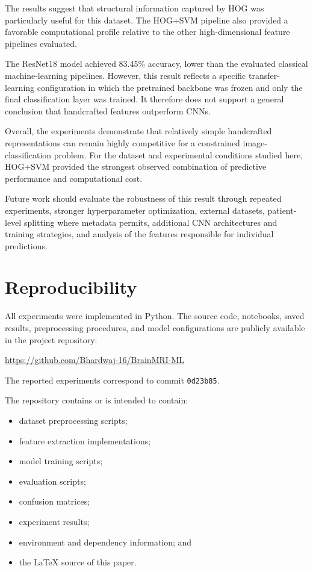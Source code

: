 \documentclass[11pt,a4paper]{article}
\begin{document}
The results suggest that structural information captured by HOG was particularly useful for this dataset. The HOG+SVM pipeline also provided a favorable computational profile relative to the other high-dimensional feature pipelines evaluated.

The ResNet18 model achieved 83.45\% accuracy, lower than the evaluated classical machine-learning pipelines. However, this result reflects a specific transfer-learning configuration in which the pretrained backbone was frozen and only the final classification layer was trained. It therefore does not support a general conclusion that handcrafted features outperform CNNs.

Overall, the experiments demonstrate that relatively simple handcrafted representations can remain highly competitive for a constrained image-classification problem. For the dataset and experimental conditions studied here, HOG+SVM provided the strongest observed combination of predictive performance and computational cost.

Future work should evaluate the robustness of this result through repeated experiments, stronger hyperparameter optimization, external datasets, patient-level splitting where metadata permits, additional CNN architectures and training strategies, and analysis of the features responsible for individual predictions.


\section{Reproducibility}

All experiments were implemented in Python. The source code, notebooks, saved results, preprocessing procedures, and model configurations are publicly available in the project repository:

\begin{center}
\url{https://github.com/Bhardwaj-16/BrainMRI-ML}
\end{center}

The reported experiments correspond to commit \texttt{0d23b85}.

The repository contains or is intended to contain:

\begin{itemize}
    \item dataset preprocessing scripts;
    \item feature extraction implementations;
    \item model training scripts;
    \item evaluation scripts;
    \item confusion matrices;
    \item experiment results;
    \item environment and dependency information; and
    \item the LaTeX source of this paper.
\end{itemize}
\end{document}
